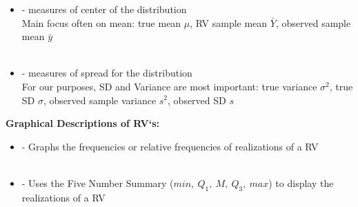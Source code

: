 \begin{itemize}
\begin{itemize}
\begin{center}
\end{center}~\\
\item 
\textcolor{red}{} 
- measures of center of the distribution\\
Main focus often on mean: true mean $\mu$, RV sample mean $\bar{Y}$, observed sample mean $\bar{y}$\\~\\
\item 
\textcolor{red}{} 
- measures of spread for the distribution\\
For our purposes, SD and Variance are most important: true variance $\sigma^2$, true SD $\sigma$, observed sample variance $s^2$, observed SD $s$
\end{itemize}
\end{itemize}

\Large \textbf{Graphical Descriptions of RV`s:}\large\\
\begin{itemize}
\item 
\textcolor{red}{} 
- Graphs the frequencies or relative frequencies of realizations of a RV\\~\\
\item 
\textcolor{red}{} 
- Uses the Five Number Summary ($min,~Q_1,~M,~Q_3,~max$) to display the realizations of a RV
\end{itemize}

